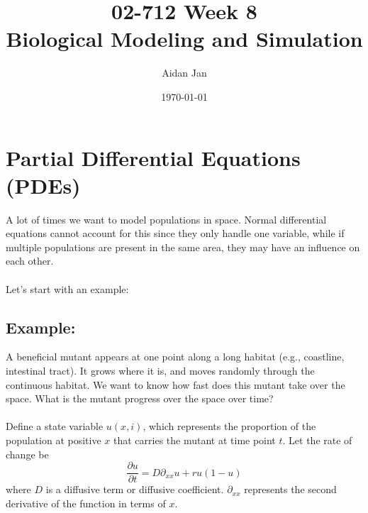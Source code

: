 \documentclass[10pt]{article}
\title{02-712 Week 8 \\ \large{Biological Modeling and Simulation}}
\author{Aidan Jan}
\date{\today}
\begin{document}
\maketitle

\section*{Partial Differential Equations (PDEs)}
A lot of times we want to model populations in space.  Normal differential equations cannot account for this since they only handle one variable, while if multiple populations are present in the same area, they may have an influence on each other.\\\\
Let's start with an example:

\subsection*{Example:}
A beneficial mutant appears at one point along a long habitat (e.g., coastline, intestinal tract).  It grows where it is, and moves randomly through the continuous habitat.  We want to know how fast does this mutant take over the space.  What is the mutant progress over the space over time?\\\\
Define a state variable $u(x, i)$, which represents the proportion of the population at positive $x$ that carries the mutant at time point $t$.  Let the rate of change be
\[\frac{\partial u}{\partial t} = D \partial_{xx}u + ru(1 - u)\]
where $D$ is a diffusive term or diffusive coefficient.  $\partial_{xx}$ represents the second derivative of the function in terms of $x$.\\\\
\end{document}
